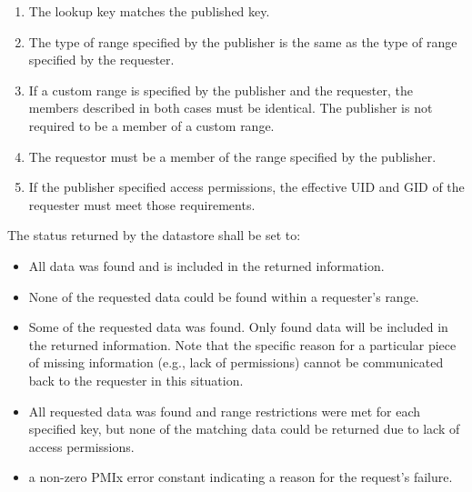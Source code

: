 \begin{enumerate}
    \item The lookup key matches the published key.
    \item The type of range specified by the publisher is the same as the type of range specified by the requester.
    \item If a custom range is specified by the publisher and the requester, the members described in both cases must be identical.  The publisher is not required to be a member of a custom range.
    \item The requestor must be a member of the range specified by the publisher.


    \item If the publisher specified access permissions, the effective \ac{UID} and \ac{GID} of the requester must meet those requirements.
\end{enumerate}

The status returned by the datastore shall be set to:

\begin{itemize}
\item {} All data was found and is included in the returned information.

\item {} None of the requested data could be found within a requester's range.

\item {} Some of the requested data was found.
Only found data will be included in the returned information. Note that the specific reason for a particular piece of missing information (e.g., lack of permissions) cannot be communicated back to the requester in this situation.

\item {} All requested data was found and range restrictions were met for each specified key, but none of the matching data could be returned due to lack of access permissions.

\item a non-zero \ac{PMIx} error constant indicating a reason for the request's failure.
\end{itemize}

